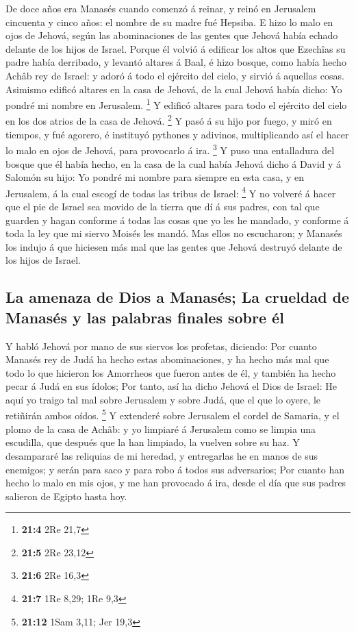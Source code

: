  De doce años era Manasés cuando comenzó á reinar, y reinó
en Jerusalem cincuenta y cinco años: el nombre de su madre fué Hepsiba.
 E hizo lo malo en ojos de Jehová, según las abominaciones
de las gentes que Jehová había echado delante de los hijos de Israel.
 Porque él volvió á edificar los altos que Ezechîas su padre
había derribado, y levantó altares á Baal, é hizo bosque, como había
hecho Achâb rey de Israel: y adoró á todo el ejército del cielo, y
sirvió á aquellas cosas.  Asimismo edificó altares en la
casa de Jehová, de la cual Jehová había dicho: Yo pondré mi nombre en
Jerusalem. \footnote{\textbf{21:4} 2Re 21,7}  Y edificó
altares para todo el ejército del cielo en los dos atrios de la casa de
Jehová. \footnote{\textbf{21:5} 2Re 23,12}  Y pasó á su hijo
por fuego, y miró en tiempos, y fué agorero, é instituyó pythones y
adivinos, multiplicando así el hacer lo malo en ojos de Jehová, para
provocarlo á ira. \footnote{\textbf{21:6} 2Re 16,3}  Y puso
una entalladura del bosque que él había hecho, en la casa de la cual
había Jehová dicho á David y á Salomón su hijo: Yo pondré mi nombre para
siempre en esta casa, y en Jerusalem, á la cual escogí de todas las
tribus de Israel: \footnote{\textbf{21:7} 1Re 8,29; 1Re 9,3}
 Y no volveré á hacer que el pie de Israel sea movido de la
tierra que dí á sus padres, con tal que guarden y hagan conforme á todas
las cosas que yo les he mandado, y conforme á toda la ley que mi siervo
Moisés les mandó.  Mas ellos no escucharon; y Manasés los
indujo á que hiciesen más mal que las gentes que Jehová destruyó delante
de los hijos de Israel.

\hypertarget{la-amenaza-de-dios-a-manasuxe9s-la-crueldad-de-manasuxe9s-y-las-palabras-finales-sobre-uxe9l}{%
\subsection{La amenaza de Dios a Manasés; La crueldad de Manasés y las
palabras finales sobre
él}\label{la-amenaza-de-dios-a-manasuxe9s-la-crueldad-de-manasuxe9s-y-las-palabras-finales-sobre-uxe9l}}

 Y habló Jehová por mano de sus siervos los profetas,
diciendo:  Por cuanto Manasés rey de Judá ha hecho estas
abominaciones, y ha hecho más mal que todo lo que hicieron los Amorrheos
que fueron antes de él, y también ha hecho pecar á Judá en sus ídolos;
 Por tanto, así ha dicho Jehová el Dios de Israel: He aquí
yo traigo tal mal sobre Jerusalem y sobre Judá, que el que lo oyere, le
retiñirán ambos oídos. \footnote{\textbf{21:12} 1Sam 3,11; Jer 19,3}
 Y extenderé sobre Jerusalem el cordel de Samaria, y el
plomo de la casa de Achâb: y yo limpiaré á Jerusalem como se limpia una
escudilla, que después que la han limpiado, la vuelven sobre su haz.
 Y desampararé las reliquias de mi heredad, y entregarlas
he en manos de sus enemigos; y serán para saco y para robo á todos sus
adversarios;  Por cuanto han hecho lo malo en mis ojos, y
me han provocado á ira, desde el día que sus padres salieron de Egipto
hasta hoy.

